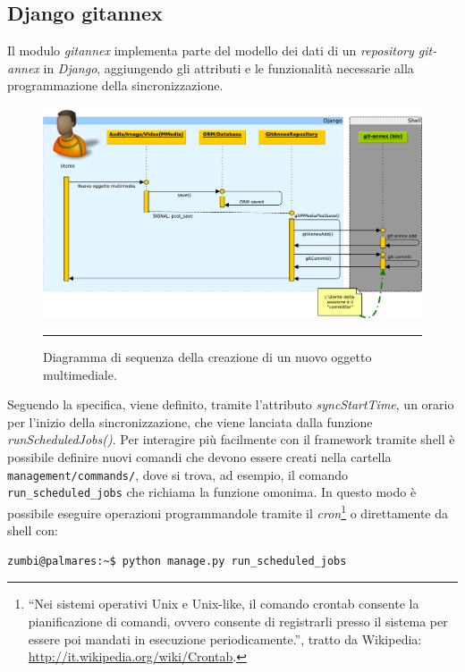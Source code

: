 \subsection{Django gitannex}

Il modulo \emph{gitannex} implementa parte del modello dei dati di un
\emph{repository git-annex} in \emph{Django}, aggiungendo gli attributi e le
funzionalità necessarie alla programmazione della sincronizzazione.

\begin{figure}[htbp]
  \centering
  \includegraphics[width=\textwidth]{./Figure/SequenceDiagram_NuovoOggetto-crop.pdf}
  \rule{35em}{0.5pt}
  \caption[Diagramma di sequenza della creazione di un nuovo oggetto
  multimediale]{Diagramma di sequenza della creazione di un nuovo
    oggetto multimediale.}
  \label{fig:SequenceDiagramAdd}
\end{figure}

Seguendo la specifica, viene definito, tramite l'attributo
\emph{syncStartTime}, un orario per l'inizio della sincronizzazione,
che viene lanciata dalla funzione \emph{runScheduledJobs()}. Per
interagire più facilmente con il framework tramite shell è possibile
definire nuovi comandi che devono essere creati nella cartella
\verb|management/commands/|, dove si trova, ad esempio, il comando
\verb|run_scheduled_jobs| che richiama la funzione omonima. In questo
modo è possibile eseguire operazioni programmandole tramite il
\emph{cron}\footnote{``Nei sistemi operativi Unix e Unix-like, il
  comando crontab consente la pianificazione di comandi, ovvero
  consente di registrarli presso il sistema per essere poi mandati in
  esecuzione periodicamente.'', tratto da Wikipedia:
  \url{http://it.wikipedia.org/wiki/Crontab}.} o direttamente da shell
con:
\begin{verbatim}
zumbi@palmares:~$ python manage.py run_scheduled_jobs
\end{verbatim}

